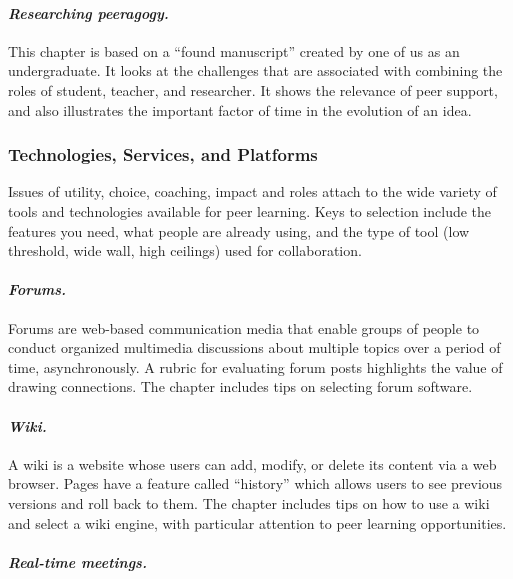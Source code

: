 \paragraph{\emph{Researching peeragogy.}}\label{researching-peeragogy.}

This chapter is based on a ``found manuscript'' created by one of us as
an undergraduate. It looks at the challenges that are associated with
combining the roles of student, teacher, and researcher. It shows the
relevance of peer support, and also illustrates the important factor of
time in the evolution of an idea.

\subsubsection{Technologies, Services, and
Platforms}\label{technologies-services-and-platforms}

Issues of utility, choice, coaching, impact and roles attach to the wide
variety of tools and technologies available for peer learning. Keys to
selection include the features you need, what people are already using,
and the type of tool (low threshold, wide wall, high ceilings) used for
collaboration.

\paragraph{\emph{Forums.}}\label{forums.}

Forums are web-based communication media that enable groups of people to
conduct organized multimedia discussions about multiple topics over a
period of time, asynchronously. A rubric for evaluating forum posts
highlights the value of drawing connections. The chapter includes tips
on selecting forum software.

\paragraph{\emph{Wiki.}}\label{wiki.}

A wiki is a website whose users can add, modify, or delete its content
via a web browser. Pages have a feature called ``history'' which allows
users to see previous versions and roll back to them. The chapter
includes tips on how to use a wiki and select a wiki engine, with
particular attention to peer learning opportunities.

\paragraph{\emph{Real-time meetings.}}\label{real-time-meetings.}

